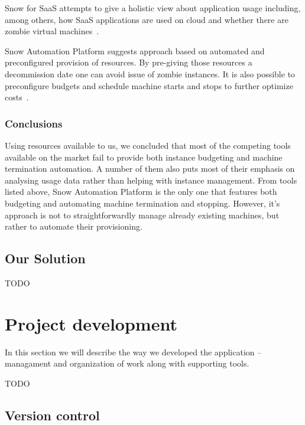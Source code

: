 \documentclass[licencjacka,en]{thesisclass}
\begin{document}
    Snow for SaaS attempts to give a holistic view about application usage including, among others,
    how SaaS applications are used on cloud and whether there are zombie virtual machines~\cite{SnowSaaS}.

    Snow Automation Platform suggests approach based on automated and preconfigured provision of resources.
    By pre-giving those resources a decommission date one can avoid issue of zombie instances.
    It is also possible to preconfigure budgets and schedule machine starts and stops to further optimize costs~\cite{SnowBlog}.

    \subsection{Conclusions}

    Using resources available to us, we concluded that most of the competing tools available on the market
    fail to provide both instance budgeting and machine termination automation.
    A number of them also puts most of their emphasis on analysing usage data rather than
    helping with instance management.
    From tools listed above, Snow Automation Platform is the only one that features both budgeting and automating
    machine termination and stopping.
    However, it's approach is not to straightforwardly manage already existing machines,
    but rather to automate their provisioning.

    \section{Our Solution}

    TODO



    \chapter{Project development}

    In this section we will describe the way we developed the application -- managament and organization of work along with supporting tools.

    TODO

    \section{Version control}
\end{document}
